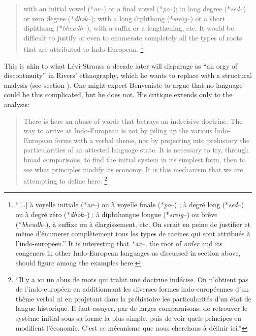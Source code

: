 \documentclass[output=paper]{langscibook}
\begin{document}
\begin{quotation}
with an initial vowel (*\emph{ar}--) or a final vowel (*\emph{po}--); in long degree (*\emph{sēd}--) or zero degree (*\emph{dhək}--); with a long diphthong (*\emph{srēig}--) or a short diphthong (*\emph{bheudh}--), with a suffix or a lengthening, etc. It would be difficult to justify or even to enumerate completely all the types of roots that are attributed to Indo-European. \citep[147]{Benveniste1935}\footnote{``[…] à voyelle initiale (*\emph{ar}--) ou à voyelle finale (*\emph{po}--) ; à degré long (*\emph{sēd}--) ou à degré zéro (*\emph{dhək}--) ; à diphthongue longue (*\emph{srēig}--) ou brève (*\emph{bheudh}--), à suffixe ou à élargissement, etc. On serait en peine de justifier et même d’énumerer complètement tous les types de racines qui sont attribués à l’indo-européen.'' It is interesting that *\emph{ar}--, the root of \emph{order} and its congeners in other Indo-European languages as discussed in section  above, should figure among the examples here.}
\end{quotation}

This is akin to what Lévi-Strauss a decade later will disparage as ``an orgy of discontinuity'' in Rivers' ethnography, which he wants to replace with a structural analysis (see section ). One might expect Benveniste to argue that no language could be this complicated, but he does not. His critique extends only to the analysis:

\begin{quotation}
There is here an abuse of words that betrays an indecisive doctrine. The way to arrive at Indo-European is not by piling up the various Indo-Eu\-ro\-pe\-an forms with a verbal theme, nor by projecting into prehistory the particularities of an attested language state. It is necessary to try, through broad comparisons, to find the initial system in its simplest form, then to see what principles modify its economy. It is this mechanism that we are attempting to define here. \citep[147--148]{Benveniste1935}\footnote{``Il y a ici un abus de mots qui trahit une doctrine indécise. On n'obtient pas de l'indo-européen en additionnant les diverses formes indo-européennes d'un thème verbal ni en projetant dans la préhistoire les particularités d'un état de langue historique. Il faut essayer, par de larges comparaisons, de retrouver le système initial sous sa forme la plus simple, puis de voir quels principes en modifient l'économie. C'est ce mécanisme que nous cherchons à définir ici.''}
\end{quotation}
\end{document}
